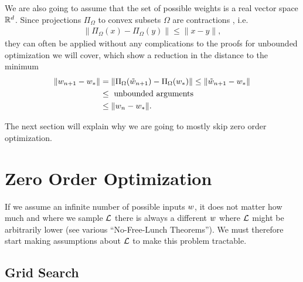 We are also going to assume that the set of possible weights is a real
vector space \(\mathbb{R}^d\). Since projections \(\Pi_\Omega\) to convex
subsets \(\Omega\) are contractions \parencite[Lemma
3.1]{bubeckConvexOptimizationAlgorithms2015}, i.e.
\begin{align*}
	\| \Pi_\Omega(x) - \Pi_\Omega(y) \| \le \| x - y \|,
\end{align*}
they can often be applied without any complications to the proofs for unbounded
optimization we will cover, which show a reduction in the distance to the
minimum
\begin{align*}
	\|w_{n+1} - w_* \|
	&= \|\Pi_\Omega(\tilde{w}_{n+1}) - \Pi_\Omega(w_*)\|
	\le \|\tilde{w}_{n+1} - w_* \|\\
	&\le \text{ unbounded arguments }\\
	&\le \|w_n - w_*\|.
\end{align*}

The next section will explain why we are going to mostly skip zero order
optimization.

\section{Zero Order Optimization}

If we assume an infinite number of possible inputs \(w\), it does not matter
how much and where we sample \(\mathcal{L}\) there is always a different \(w\) where
\(\mathcal{L}\) might be arbitrarily lower (see various ``No-Free-Lunch Theorems'').
We must therefore start making assumptions about \(\mathcal{L}\) to make this
problem tractable.

\subsection{Grid Search}


